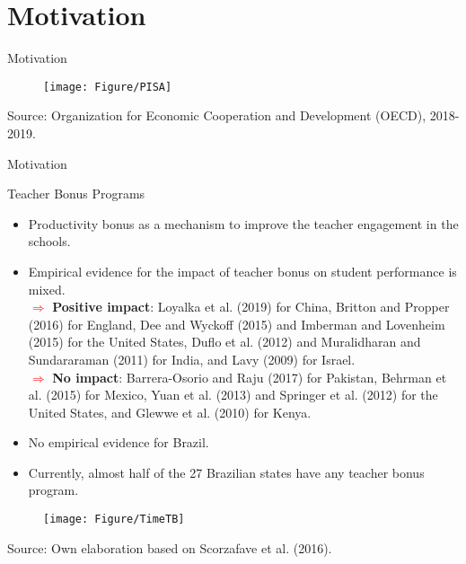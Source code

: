 \documentclass{beamer}
\begin{document}
\section{Motivation}

\begin{frame}{Motivation}
\begin{figure}[htb]
\vspace{-8pt}
\centering
\texttt{[image: Figure/PISA]}
\end{figure}
     \vspace{-13pt}  \hspace{15pt}
\begin{minipage}{1\textwidth} 
{{\fontsize{4}{4}\selectfont  
Source: Organization for Economic Cooperation and Development (OECD), 2018-2019.\par}}
\end{minipage} 
\end{frame}



\begin{frame}{Motivation}

\begin{block}{\centering Teacher Bonus Programs}
 \begin{itemize}
\item \scriptsize Productivity bonus as a mechanism to improve the teacher engagement in the schools.
\item \scriptsize Empirical evidence for the impact of teacher bonus on student performance is mixed.
\\ \tiny\textcolor{red}{$\Longrightarrow$} \textbf{Positive impact}: Loyalka et al. (2019) for China, Britton and Propper (2016) for England, Dee and Wyckoff (2015) and Imberman and Lovenheim (2015) for the United States, Duflo et al. (2012) and Muralidharan and Sundararaman (2011) for India, and Lavy (2009) for Israel.
\\ \tiny\textcolor{red}{$\Longrightarrow$} \textbf{No impact}: Barrera-Osorio and Raju (2017) for Pakistan, Behrman et al. (2015) for Mexico, Yuan et al. (2013) and Springer et al. (2012) for the United States, and Glewwe et al. (2010) for Kenya.
\item \scriptsize No empirical evidence for Brazil.
\item \scriptsize Currently, almost half of the 27 Brazilian states have any teacher bonus program.
\end{itemize}
\end{block}

\begin{figure}[htb]
\centering
\texttt{[image: Figure/TimeTB]}
\end{figure}
     \vspace{-5.3cm}  \hspace{8pt}
\begin{minipage}{1\textwidth} 
{{\fontsize{4}{4}\selectfont  
Source: Own elaboration based on Scorzafave et al. (2016).\par}}
\end{minipage} 
\end{frame}
\end{document}
